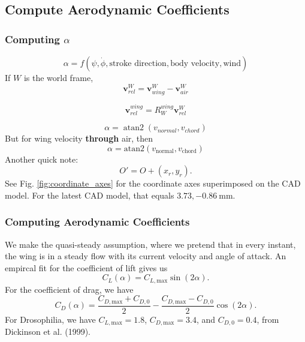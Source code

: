 \documentclass{article}
\begin{document}
\subsection{Compute Aerodynamic Coefficients} 
\subsubsection{Computing \(\alpha\)} 
\begin{equation}
\alpha = f(\psi, \dot{\phi}, \text{stroke direction}, \text{body velocity}, \text{wind})
\end{equation}
If \(W\) is the world frame, 
\begin{equation}
    \mathbf{v}_{rel}^{W}
=
\mathbf{v}_{wing}^{W}
-
\mathbf{v}_{air}^{W}
\end{equation}

\begin{equation}
    \mathbf{v}_{rel}^{wing}
=
R_{W}^{wing}\mathbf{v}_{rel}^{W}
\end{equation}

\begin{equation}
    \alpha = \operatorname{atan2}
\left(
v_{normal},
v_{chord}
\right)
\end{equation}
But for wing velocity \textbf{through} air, then 
\begin{equation}
    \alpha = \mathrm{atan2} (v_{\mathrm{normal}}, v_{\mathrm{chord}})
\end{equation} Another quick note: 
\begin{equation}
    O' = O + (x_r, y_r).
\end{equation}
See Fig. \ref{fig:coordinate_axes} for the coordinate axes superimposed on the CAD model. For the latest CAD model, that equals \(3.73, -0.86 \: \mathrm{mm}\). 
\subsubsection{Computing Aerodynamic Coefficients} 
We make the quasi-steady assumption, where we pretend that in every instant, the wing is in a steady flow with its current velocity and angle of attack. An empircal fit for the coefficient of lift gives us 
\begin{equation}
    C_L(\alpha) = C_{L,\mathrm{max}} \sin(2\alpha). 
\end{equation}
For the coefficient of drag, we have 
\begin{equation}
    C_D(\alpha) = \frac{C_{D,\mathrm{max}} + C_{D,0}}{2} - \frac{C_{D,\mathrm{max}} - C_{D,0}}{2} \cos(2\alpha).
\end{equation}
For Drosophilia, we have \(C_{L,\mathrm{max}} = 1.8\), \(C_{D,\mathrm{max}} = 3.4\), and \(C_{D,0} = 0.4\), from Dickinson et al. (1999). 
\end{document}
